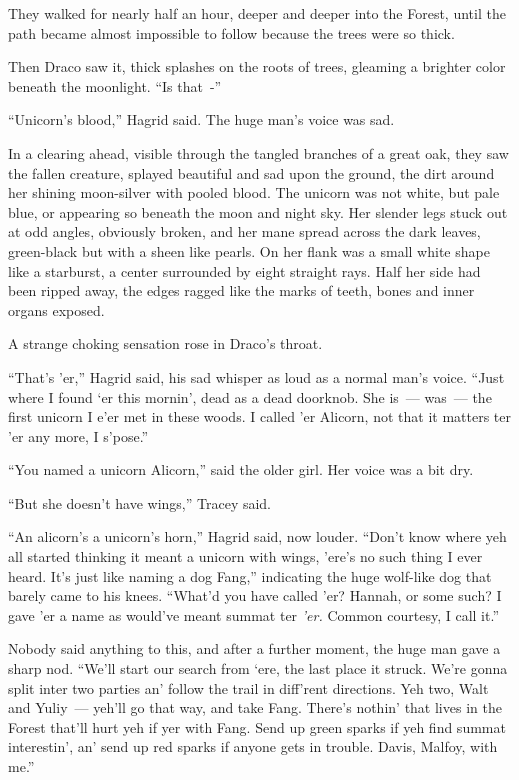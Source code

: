 They walked for nearly half an hour, deeper and deeper into the Forest, until the path became almost impossible to follow because the trees were so thick.

Then Draco saw it, thick splashes on the roots of trees, gleaming a brighter color beneath the moonlight. ``Is that~-''

``Unicorn's blood,'' Hagrid said. The huge man's voice was sad.

In a clearing ahead, visible through the tangled branches of a great oak, they saw the fallen creature, splayed beautiful and sad upon the ground, the dirt around her shining moon-silver with pooled blood. The unicorn was not white, but pale blue, or appearing so beneath the moon and night sky. Her slender legs stuck out at odd angles, obviously broken, and her mane spread across the dark leaves, green-black but with a sheen like pearls. On her flank was a small white shape like a starburst, a center surrounded by eight straight rays. Half her side had been ripped away, the edges ragged like the marks of teeth, bones and inner organs exposed.

A strange choking sensation rose in Draco's throat.

``That's 'er,'' Hagrid said, his sad whisper as loud as a normal man's voice. ``Just where I found `er this mornin', dead as a dead doorknob. She is~--- was~--- the first unicorn I e'er met in these woods. I called 'er Alicorn, not that it matters ter 'er any more, I s'pose.''

``You named a unicorn Alicorn,'' said the older girl. Her voice was a bit dry.

``But she doesn't have wings,'' Tracey said.

``An alicorn's a unicorn's horn,'' Hagrid said, now louder. ``Don't know where yeh all started thinking it meant a unicorn with wings, 'ere's no such thing I ever heard. It's just like naming a dog Fang,'' indicating the huge wolf-like dog that barely came to his knees. ``What'd you have called 'er? Hannah, or some such? I gave 'er a name as would've meant summat ter \emph{'er.} Common courtesy, I call it.''

Nobody said anything to this, and after a further moment, the huge man gave a sharp nod. ``We'll start our search from `ere, the last place it struck. We're gonna split inter two parties an' follow the trail in diff'rent directions. Yeh two, Walt and Yuliy~--- yeh'll go that way, and take Fang. There's nothin' that lives in the Forest that'll hurt yeh if yer with Fang. Send up green sparks if yeh find summat interestin', an' send up red sparks if anyone gets in trouble. Davis, Malfoy, with me.''

